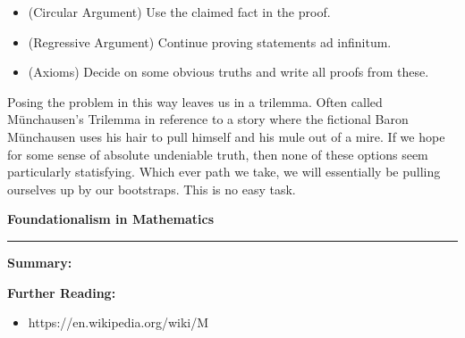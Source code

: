 \documentclass{article}
\begin{document}
\begin{itemize}
  \item[] (Circular Argument) Use the claimed fact in the proof.
  \item[] (Regressive Argument) Continue proving statements ad infinitum.
  \item[] (Axioms) Decide on some obvious truths and write all proofs from these.
\end{itemize}

Posing the problem in this way leaves us in a trilemma. Often called M{\"u}nchausen's Trilemma in reference to a story where the fictional Baron M{\"u}nchausen uses his hair to pull himself and his mule out of a mire. If we hope for some sense of absolute undeniable truth, then none of these options seem particularly statisfying. Which ever path we take, we will essentially be pulling ourselves up by our bootstraps. This is no easy task.

\vspace{2em}
{\bf Foundationalism in Mathematics}

\newpage
\hrule
\vspace{1em}
{\bf Summary:}

{\bf Further Reading:}
\begin{itemize}
  \item https://en.wikipedia.org/wiki/M%

\end{itemize}
\end{document}
